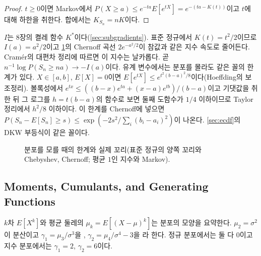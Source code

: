 \begin{proof}
$t\ge0$이면 Markov에서 $P(X\ge a)\le e^{-ta}E[e^{tX}]=e^{-(ta-K(t))}$이고 $t$에 대해 하한을 취한다. 합에서는 $K_{S_n}=nK$이다.
\end{proof}

$I$는 8장의 켤레 함수 $K^\ast$이다(\cref{sec:subgradients}). 표준 정규에서 $K(t)=t^2/2$이므로 $I(a)=a^2/2$이고 \cref{fig:tailbounds}의 Chernoff 곡선 $2e^{-a^2/2}$이 참값과 같은 지수 속도로 줄어든다. Cram\'er의 대편차 정리에 따르면 이 지수는 날카롭다. 곧 $n^{-1}\log P(S_n\ge na)\to-I(a)$이다. 유계 변수에서는 분포를 몰라도 같은 꼴의 한계가 있다. $X\in[a,b]$, $E[X]=0$이면 $E[e^{tX}]\le e^{t^2(b-a)^2/8}$이다(Hoeffding의 보조정리). 볼록성에서 $e^{tx}\le((b-x)e^{ta}+(x-a)e^{tb})/(b-a)$이고 기댓값을 취한 뒤 그 로그를 $h=t(b-a)$의 함수로 보면 둘째 도함수가 $1/4$ 이하이므로 Taylor 정리에서 $h^2/8$ 이하이다. 이 한계를 Chernoff에 넣으면  $P(S_n-E[S_n]\ge s)\le\exp(-2s^2/\sum_i(b_i-a_i)^2)$이 나온다. \cref{sec:ecdf}의 DKW 부등식이 같은 꼴이다.

\begin{figure}[htbp]
\centering
{}
\caption{분포를 모를 때의 한계와 실제 꼬리(표준 정규의 양쪽 꼬리와 Chebyshev, Chernoff; 평균 $1$인 지수와 Markov).}
\label{fig:tailbounds}
\end{figure}

\subsection{Moments, Cumulants, and Generating Functions}

$k$차  $E[X^k]$와 평균 둘레의  $\mu_k=E[(X-\mu)^k]$는 분포의 모양을 요약한다. $\mu_2=\sigma^2$이 분산이고 $\gamma_1=\mu_3/\sigma^3$을 , $\gamma_2=\mu_4/\sigma^4-3$을 라 한다. 정규 분포에서는 둘 다 $0$이고 지수 분포에서는 $\gamma_1=2$, $\gamma_2=6$이다.

